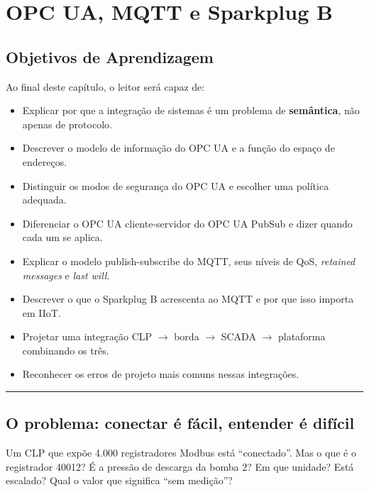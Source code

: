 \chapter{OPC UA, MQTT e Sparkplug B}\label{opc-ua-mqtt-e-sparkplug-b}

\section*{Objetivos de Aprendizagem}

Ao final deste capítulo, o leitor será capaz de:

\begin{itemize}
\tightlist
\item
  Explicar por que a integração de sistemas é um problema de \textbf{semântica}, não apenas de protocolo.
\item
  Descrever o modelo de informação do OPC UA e a função do espaço de endereços.
\item
  Distinguir os modos de segurança do OPC UA e escolher uma política adequada.
\item
  Diferenciar o OPC UA cliente-servidor do OPC UA PubSub e dizer quando cada um se aplica.
\item
  Explicar o modelo publish-subscribe do MQTT, seus níveis de QoS, \emph{retained messages} e \emph{last will}.
\item
  Descrever o que o Sparkplug B acrescenta ao MQTT e por que isso importa em IIoT.
\item
  Projetar uma integração CLP \ensuremath{\rightarrow} borda \ensuremath{\rightarrow} SCADA \ensuremath{\rightarrow} plataforma combinando os três.
\item
  Reconhecer os erros de projeto mais comuns nessas integrações.
\end{itemize}

\begin{center}\rule{0.5\linewidth}{0.5pt}\end{center}

\section{O problema: conectar é fácil, entender é difícil}\label{o-problema-conectar-uxe9-fuxe1cil-entender-uxe9-difuxedcil}

Um CLP que expõe 4.000 registradores Modbus está ``conectado''. Mas o que é o registrador 40012? É a pressão de descarga da bomba 2? Em que unidade? Está escalado? Qual o valor que significa ``sem medição''?


